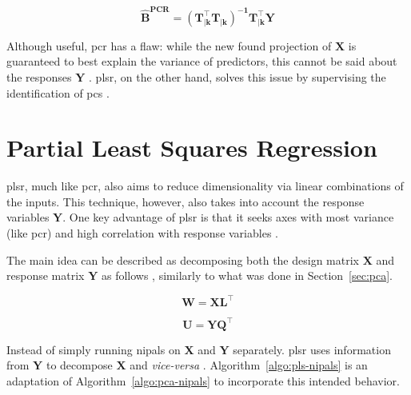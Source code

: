 \begin{equation}
	\label{eqn:beta-pcr}
	\mathbf{\hat{B}^{\text{PCR}} = (T_{|k}^\intercal T_{|k})^{-1}T_{|k}^\intercal Y}
\end{equation}

Although useful, \acrshort{pcr} has a flaw: while the new found projection of $\mathbf{X}$ is guaranteed to best explain the variance of predictors, this cannot be said about the responses $\mathbf{Y}$ \parencite{james2013introduction}. \acrshort{plsr}, on the other hand, solves this issue by supervising the identification of \acrshort{pc}s \parencite{james2013introduction}.
	
\section{Partial Least Squares Regression}
\label{sec:plsr}

\acrshort{plsr}, much like \acrshort{pcr}, also aims to reduce dimensionality via linear combinations of the inputs. This technique, however, also takes into account the response variables $\mathbf{Y}$. One key advantage of \acrshort{plsr} is that it seeks axes with most variance (like \acrshort{pcr}) and high correlation with response variables \parencite{friedman2001}.

The main idea can be described as decomposing both the design matrix $\mathbf{X}$ and response matrix $\mathbf{Y}$ as follows \parencite{ng2013}, similarly to what was done in Section~\ref{sec:pca}.

\begin{equation}
	\label{eqn:x-decomp}
	\mathbf{W=XL^\intercal}
\end{equation}

\begin{equation}
	\label{eqn:y-decomp}
	\mathbf{U = YQ^\intercal}
\end{equation}

Instead of simply running \acrshort{nipals} on $\mathbf{X}$ and $\mathbf{Y}$ separately. \acrshort{plsr} uses information from $\mathbf{Y}$ to decompose $\mathbf{X}$ and \textit{vice-versa} \parencite{ng2013}. Algorithm~\ref{algo:pls-nipals} is an adaptation of Algorithm~\ref{algo:pca-nipals} to incorporate this intended behavior.

